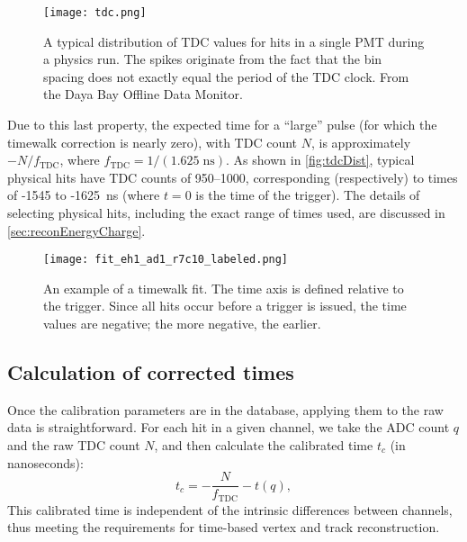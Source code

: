 \documentclass[../thesis.tex]{subfiles}
\begin{document}
\begin{figure}[ht]
  \texttt{[image: tdc.png]}
  \caption{A typical distribution of TDC values for hits in a single PMT during a physics run. The spikes originate from the fact that the bin spacing does not exactly equal the period of the TDC clock. From the Daya Bay Offline Data Monitor.}
  \label{fig:tdcDist}
\end{figure}

Due to this last property, the expected time for a ``large'' pulse (for which the timewalk correction is nearly zero), with TDC count $N$, is approximately $-N/f_{\mathrm{TDC}}$, where $f_{\mathrm{TDC}} = 1/(1.625\;\text{ns})$. As shown in \autoref{fig:tdcDist}, typical physical hits have TDC counts of 950--1000, corresponding (respectively) to times of -1545 to -1625~ns (where $t = 0$ is the time of the trigger). The details of selecting physical hits, including the exact range of times used, are discussed in \autoref{sec:reconEnergyCharge}.


\begin{figure}
  \texttt{[image: fit\_eh1\_ad1\_r7c10\_labeled.png]}
  \caption{An example of a timewalk fit. The time axis is defined relative to the trigger. Since all hits occur before a trigger is issued, the time values are negative; the more negative, the earlier.}
  \label{fig:timewalk}
\end{figure}

\begin{comment}
  Show the tof-corrected times; comment on TDC discretization.
\end{comment}

\subsection{Calculation of corrected times}

Once the calibration parameters are in the database, applying them to the raw data is straightforward. For each hit in a given channel, we take the ADC count $q$ and the raw TDC count $N$, and then calculate the calibrated time $t_c$ (in nanoseconds):
\begin{equation}
  \label{eq:corrTime}
  t_c = -\frac{N}{f_\mathrm{TDC}} - t(q),
\end{equation}
This calibrated time is independent of the intrinsic differences between channels, thus meeting the requirements for time-based vertex and track reconstruction.
\end{document}
